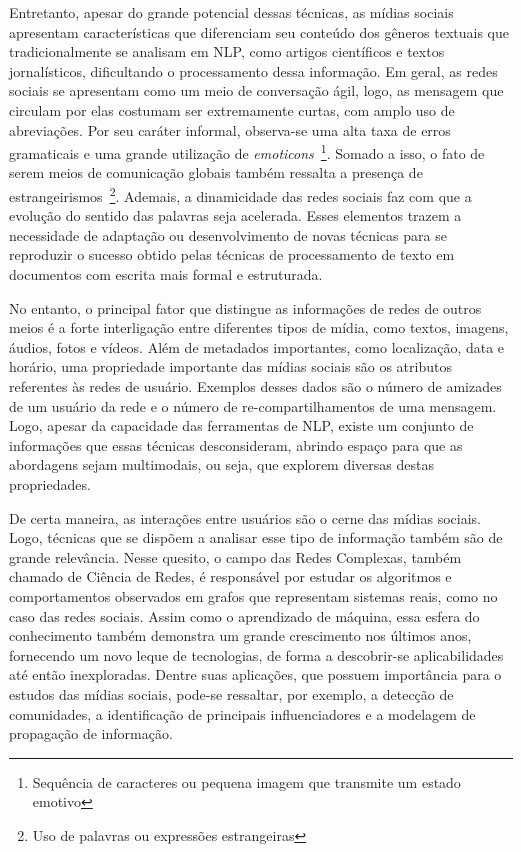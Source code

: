 Entretanto, apesar do grande potencial dessas técnicas, as mídias sociais
apresentam características que diferenciam seu conteúdo dos gêneros textuais que
tradicionalmente se analisam em NLP, como artigos científicos e textos
jornalísticos, dificultando o processamento dessa informação.
Em geral, as redes sociais se apresentam como um meio de conversação ágil, logo,
as mensagem que circulam por elas costumam ser extremamente curtas, com amplo
uso de abreviações.
Por seu caráter informal, observa-se uma alta taxa de erros gramaticais e
uma grande utilização de \textit{emoticons}~\footnote{Sequência de caracteres ou
pequena imagem que transmite um estado emotivo}.
Somado a isso, o fato de serem meios de comunicação globais também ressalta a
presença de estrangeirismos~\footnote{Uso de palavras ou expressões estrangeiras}.
Ademais, a dinamicidade das redes sociais faz com que a evolução do sentido das
palavras seja acelerada.
Esses elementos trazem a necessidade de adaptação ou desenvolvimento de novas
técnicas para se reproduzir o sucesso obtido pelas técnicas de processamento de
texto em documentos com escrita mais formal e estruturada.

No entanto, o principal fator que distingue as informações de redes de outros
meios é a forte interligação entre diferentes tipos de mídia, como textos, imagens,
áudios, fotos e vídeos.
Além de metadados importantes, como localização, data e horário, uma propriedade
importante das mídias sociais são os atributos referentes às redes de usuário.
Exemplos desses dados são o número de amizades de um usuário da rede e o
número de re-compartilhamentos de uma mensagem.
Logo, apesar da capacidade das ferramentas de NLP, existe um conjunto de
informações que essas técnicas desconsideram, abrindo espaço para que as
abordagens sejam multimodais, ou seja, que explorem diversas destas
propriedades.

De certa maneira, as interações entre usuários são o cerne das mídias sociais.
Logo, técnicas que se dispõem a analisar esse tipo de informação também são de
grande relevância.
Nesse quesito, o campo das Redes Complexas, também chamado de Ciência de Redes,
é responsável por estudar os algoritmos e comportamentos observados em grafos
que representam sistemas reais, como no caso das redes sociais.
Assim como o aprendizado de máquina, essa esfera do conhecimento também
demonstra um grande crescimento nos últimos anos, fornecendo um novo leque de
tecnologias, de forma a descobrir-se aplicabilidades até então inexploradas.
Dentre suas aplicações, que possuem importância para o estudos das mídias
sociais, pode-se ressaltar, por exemplo, a detecção de comunidades, a
identificação de principais influenciadores e a modelagem de propagação de
informação.

